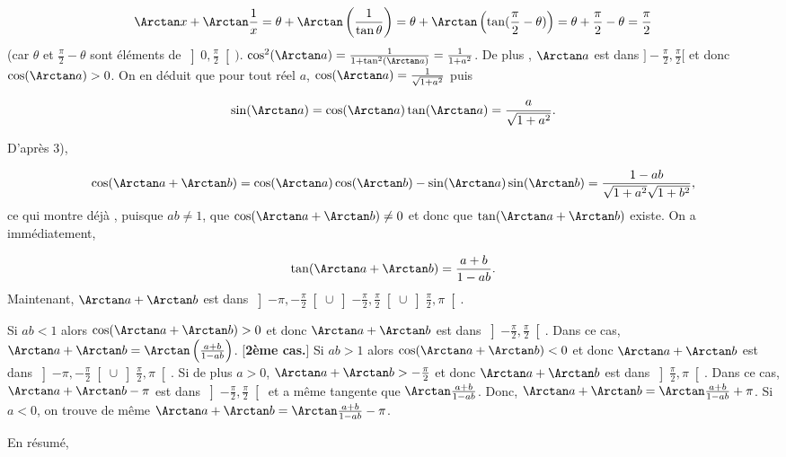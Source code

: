 {\begin{enumerate}
{$$\Arctan x+\Arctan\frac{1}{x}=\theta+\Arctan\left(\frac{1}{\tan\theta}\right)
=\theta+\Arctan\left(\tan(\frac{\pi}{2}-\theta)\right)
=\theta+\frac{\pi}{2}-\theta=\frac{\pi}{2}$$
(car $\theta$ et $\frac{\pi}{2}-\theta$ sont éléments de
$\left]0,\frac{\pi}{2}\right[)$.
$\cos^2(\Arctan a)=\frac{1}{1+\tan^2(\Arctan a)}=\frac{1}{1+a^2}$. De plus , $\Arctan
a$ est dans $]-\frac{\pi}{2},\frac{\pi}{2}[$ et donc $\cos(\Arctan a)>0$.
On en déduit que pour tout réel $a$, $\cos(\Arctan a)=\frac{1}{\sqrt{1+a^2}}$ puis

$$\sin(\Arctan a)=\cos(\Arctan a)\tan(\Arctan a)=\frac{a}{\sqrt{1+a^2}}.$$

\begin{center}
\end{center}
D'après 3),

$$\cos(\Arctan a+\Arctan b)=\cos(\Arctan a)\cos(\Arctan
b)-\sin(\Arctan a)\sin(\Arctan b)=\frac{1-ab}{\sqrt{1+a^2}\sqrt{1+b^2}},$$
ce qui montre déjà , puisque $ab\neq1$, que
$\cos(\Arctan a+\Arctan b)\neq0$ et donc que $\tan(\Arctan a+\Arctan b)$ existe. On a immédiatement,

$$\tan(\Arctan a+\Arctan b)=\frac{a+b}{1-ab}.$$
Maintenant, $\Arctan a+\Arctan b$ est dans
$\left]-\pi,-\frac{\pi}{2}\right[\cup\left]-\frac{\pi}{2},\frac{\pi}{2}\right[\cup\left]\frac{\pi}{2},\pi\right[$.

\begin{itemize}
 Si $ab<1$ alors $\cos(\Arctan a+\Arctan
b)>0$ et donc $\Arctan a+\Arctan b$ est dans $\left]-\frac{\pi}{2},\frac{\pi}{2}\right[$.
Dans ce cas, $\Arctan a+\Arctan b=\Arctan\left(\frac{a+b}{1-ab}\right)$.
[\textbf{2ème cas.}]
Si $ab>1$ alors $\cos(\Arctan a+\Arctan b)<0$ et donc $\Arctan a+\Arctan b$ est 
dans $\left]-\pi,-\frac{\pi}{2}\right[\cup\left]\frac{\pi}{2},\pi\right[$. Si de plus $a>0$, 
$\Arctan a+\Arctan b>-\frac{\pi}{2}$ et donc $\Arctan a+\Arctan b$ est dans 
$\left]\frac{\pi}{2},\pi\right[$. Dans ce cas, $\Arctan a+\Arctan b-\pi$ est dans
$\left]-\frac{\pi}{2},\frac{\pi}{2}\right[$ et a même tangente que 
$\Arctan\frac{a+b}{1-ab}$. Donc, $\Arctan a+\Arctan 
b=\Arctan\frac{a+b}{1-ab}+\pi$. Si $a<0$, on trouve de même $\Arctan a+\Arctan
b=\Arctan\frac{a+b}{1-ab}-\pi$.
\end{itemize}
En résumé,

\begin{center}
\end{center}
}
\end{enumerate}
}
